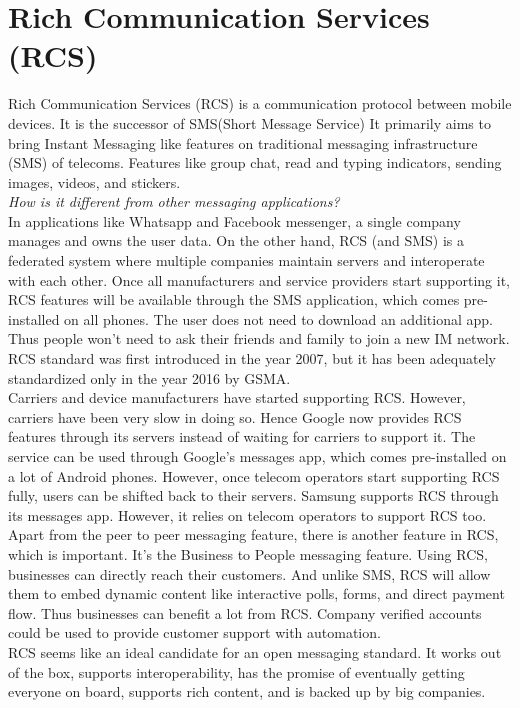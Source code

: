 \documentclass[11pt, conference, a4paper]{IEEEtran}
\begin{document}
\section{Rich Communication Services (RCS)}
\label{SEC: rcs}
Rich Communication Services (RCS) is a communication protocol between mobile devices. It is the successor of SMS(Short Message Service) It primarily aims to bring Instant Messaging like features on traditional messaging infrastructure (SMS) of telecoms. Features like group chat, read and typing indicators, sending images, videos, and stickers.\\
\textit{How is it different from other messaging applications?}\\ In applications like Whatsapp and Facebook messenger, a single company manages and owns the user data. On the other hand, RCS (and SMS) is a federated system where multiple companies maintain servers and interoperate with each other. Once all manufacturers and service providers start supporting it, RCS features will be available through the SMS application, which comes pre-installed on all phones. The user does not need to download an additional app. Thus people won't need to ask their friends and family to join a new IM network. RCS standard was first introduced in the year 2007, but it has been adequately standardized only in the year 2016 by GSMA. \cite{rcs-wiki} \\
Carriers and device manufacturers have started supporting RCS. However, carriers have been very slow in doing so. Hence Google now provides RCS features through its servers instead of waiting for carriers to support it. The service can be used through Google's messages app, which comes pre-installed on a lot of Android phones. However, once telecom operators start supporting RCS fully, users can be shifted back to their servers. Samsung supports RCS through its messages app. However, it relies on telecom operators to support RCS too.\\
Apart from the peer to peer messaging feature, there is another feature in RCS, which is important. It's the Business to People messaging feature. Using RCS, businesses can directly reach their customers. And unlike SMS, RCS will allow them to embed dynamic content like interactive polls, forms, and direct payment flow. Thus businesses can benefit a lot from RCS. Company verified accounts could be used to provide customer support with automation.\\
RCS seems like an ideal candidate for an open messaging standard. It works out of the box, supports interoperability, has the promise of eventually getting everyone on board, supports rich content, and is backed up by big companies.\\
\end{document}
